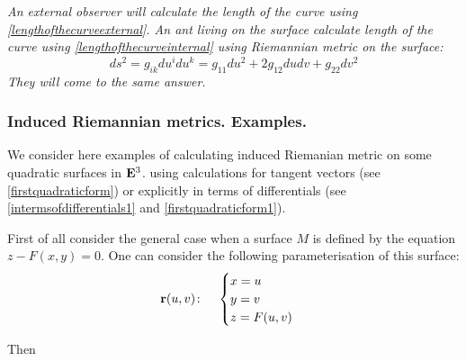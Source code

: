 \documentclass[12pt]{article}
\theoremstyle{theorem}
\numberwithin{equation}{section}
\begin{document}
{\it An external observer will calculate the length of the curve using
\eqref{lengthofthecurveexternal}.  An ant living on the surface calculate
length of the curve using
\eqref{lengthofthecurveinternal} using  Riemannian
metric on the surface:
\begin{equation}\label{riem}
  ds^2=g_{ik}du^idu^k=g_{11}du^2+2g_{12}dudv+g_{22}dv^2
\end{equation}
 They will come to the same answer.}
\smallskip

\subsubsection{Induced Riemannian metrics. Examples.}

We consider here examples of calculating induced Riemanian metric
on some quadratic surfaces in ${\bf E}^3$.
using calculations for tangent vectors (see \eqref{firstquadraticform}) or
explicitly in terms of differentials (see \eqref{intermsofdifferentials1} and \eqref{firstquadraticform1}).




\m

First of all  consider  the general case when
 a surface $M$ is defined by the
 equation $z-F(x,y)=0$. One can consider the following parameterisation
 of this surface:
\begin{equation}\label{surface}
  {\bf r}(u,v)\colon\quad
  \begin{cases}
  x=u\\
  y=v\\
  z=F(u,v)
  \end{cases}
\end{equation}

Then
\end{document}

